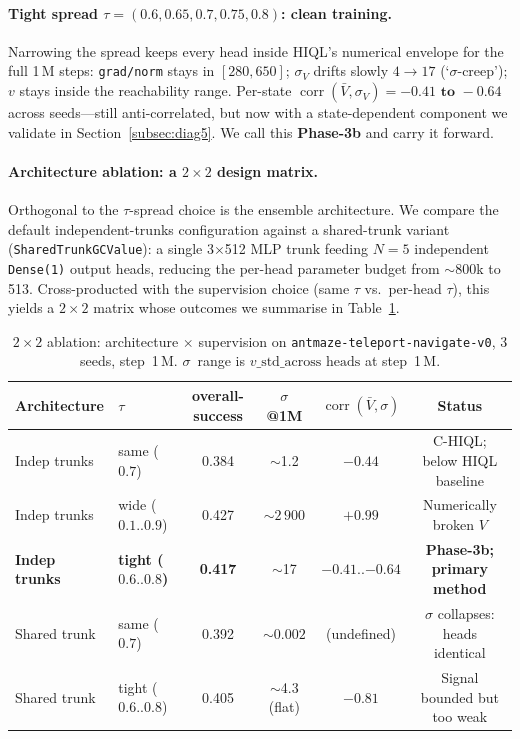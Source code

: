 \documentclass[11pt]{article}
\begin{document}
\paragraph{Tight spread $\tau = (0.6, 0.65, 0.7, 0.75, 0.8)$: clean training.}
Narrowing the spread keeps every head inside HIQL's numerical envelope for
the full 1\,M steps: \texttt{grad/norm} stays in $[280, 650]$; $\sigma_V$
drifts slowly $4 \to 17$ (`$\sigma$-creep'); $v$ stays inside the reachability
range.
Per-state $\operatorname{corr}(\bar V, \sigma_V) = \mathbf{-0.41\text{ to }-0.64}$
across seeds---still anti-correlated, but now with a state-dependent component
we validate in Section~\ref{subsec:diag5}.
We call this \textbf{Phase-3b} and carry it forward.

\paragraph{Architecture ablation: a $2 \times 2$ design matrix.}
Orthogonal to the $\tau$-spread choice is the ensemble architecture.
We compare the default independent-trunks configuration against a
shared-trunk variant (\texttt{SharedTrunkGCValue}): a single 3$\times$512
MLP trunk feeding $N = 5$ independent \texttt{Dense(1)} output heads,
reducing the per-head parameter budget from $\sim$800k to 513.
Cross-producted with the supervision choice (same $\tau$ vs.\ per-head
$\tau$), this yields a $2 \times 2$ matrix whose outcomes we summarise in
Table~\ref{tab:2x2}.

\begin{table}[h]
  \centering
  \caption{$2{\times}2$ ablation: architecture $\times$ supervision on
           \texttt{antmaze-teleport-navigate-v0}, 3 seeds, step~1\,M.
           $\sigma$~range is $v\_\text{std}\_\text{across heads}$ at step~1\,M.}
  \label{tab:2x2}
  \small
  \begin{tabular}{llcccc}
    \toprule
    Architecture & $\tau$ & overall-success & $\sigma$ @1M & $\operatorname{corr}(\bar V,\sigma)$ & Status \\
    \midrule
    Indep trunks & same ($0.7$)    & 0.384 & $\sim$1.2  & $-0.44$ & C-HIQL; below HIQL baseline \\
    Indep trunks & wide ($0.1..0.9$) & 0.427 & $\sim 2\,900$ & $+0.99$ & Numerically broken $V$ \\
    \textbf{Indep trunks} & \textbf{tight ($0.6..0.8$)} & \textbf{0.417} & $\sim$17 & $-0.41..{-0.64}$ & \textbf{Phase-3b; primary method} \\
    Shared trunk & same ($0.7$) & 0.392 & $\mathbf{\sim 0.002}$ & (undefined) & $\sigma$ collapses: heads identical \\
    Shared trunk & tight ($0.6..0.8$) & 0.405 & $\sim$4.3 (flat) & $-0.81$ & Signal bounded but too weak \\
    \bottomrule
  \end{tabular}
\end{table}
\end{document}
